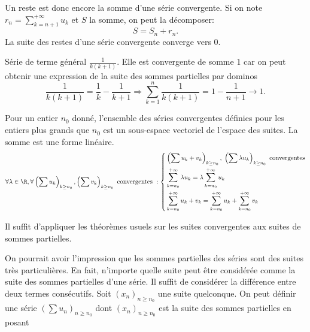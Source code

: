 Un reste est donc encore la somme d'une série convergente. Si on note $r_n = \sum_{k=n+1}^{+\infty} u_k$ et $S$ la somme, on peut la décomposer:
\begin{displaymath}
  S = S_n + r_n .
\end{displaymath}
La suite des restes d'une série convergente converge vers $0$.
\begin{exple}
  Série de terme général $\frac{1}{k(k+1)}$.\newline
  Elle est convergente de somme $1$ car on peut obtenir une expression de la suite des sommes partielles par dominos
  \[
   \frac{1}{k(k+1)} = \frac{1}{k} - \frac{1}{k+1} \Rightarrow \sum_{k=1}^{n}\frac{1}{k(k+1)} = 1 - \frac{1}{n+1} \rightarrow 1.
  \]
\end{exple}

\begin{prop}
  Pour un entier $n_0$ donné, l'ensemble des séries convergentes définies pour les entiers plus grands que $n_0$ est un sous-espace vectoriel de l'espace des suites. La somme est une forme linéaire.
\begin{displaymath}
  \forall\lambda \in \R, \forall \left( \sum u_k \right)_{k\geq n_0}, \left( \sum v_k \right)_{k\geq n_0} \text{ convergentes }:
\left\lbrace 
\begin{aligned}
  &\left( \sum u_k + v_k\right)_{k\geq n_0}, \; \left( \sum \lambda u_k \right)_{k\geq n_0} \text{ convergentes}\\
  &\sum_{k=n_0}^{+\infty} \lambda u_k = \lambda \sum_{k=n_0}^{+\infty}  u_k\\
  &\sum_{k=n_0}^{+\infty} u_k + v_k = \sum_{k=n_0}^{+\infty} u_k + \sum_{k=n_0}^{+\infty}  v_k
\end{aligned}
\right. 
\end{displaymath}
\end{prop}
\begin{demo}
  Il suffit d'appliquer les théorèmes usuels sur les suites convergentes aux suites de sommes partielles.
\end{demo}
On pourrait avoir l'impression que les sommes partielles des séries sont des suites très particulières. En fait, n'importe quelle suite peut être considérée comme la suite des sommes partielles d'une série. Il suffit de considérer la différence entre deux termes consécutifs.\newline
Soit $\left( x_n\right)_{n\geq n_0}$ une suite quelconque. On peut définir une série $\left( \sum u_n\right)_{n\geq n_0}$ dont $\left( x_n\right)_{n\geq n_0}$ est la suite des sommes partielles en posant
